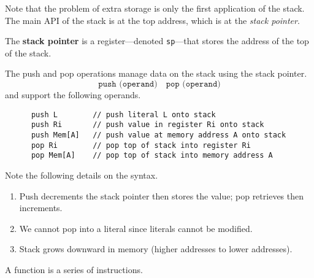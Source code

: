   Note that the problem of extra storage is only the first application of the stack. The main API of the stack is at the top address, which is at the \textit{stack pointer}. 

  \begin{definition}
    The \textbf{stack pointer} is a register---denoted \texttt{sp}---that stores the address of the top of the stack. 
  \end{definition}

  \begin{definition}
    The push and pop operations manage data on the stack using the stack pointer.
    \begin{equation}
      \texttt{push (operand)} \quad \texttt{pop (operand)}
    \end{equation}
    and support the following operands.
    \begin{lstlisting}
      push L        // push literal L onto stack
      push Ri       // push value in register Ri onto stack
      push Mem[A]   // push value at memory address A onto stack
      pop Ri        // pop top of stack into register Ri
      pop Mem[A]    // pop top of stack into memory address A
    \end{lstlisting}
    Note the following details on the syntax.
    \begin{enumerate}
      \item Push decrements the stack pointer then stores the value; pop retrieves then increments.
      \item We cannot pop into a literal since literals cannot be modified.
      \item Stack grows downward in memory (higher addresses to lower addresses).
    \end{enumerate}
  \end{definition}

  \begin{definition}[Function]
    A function is a series of instructions. 
  \end{definition}

